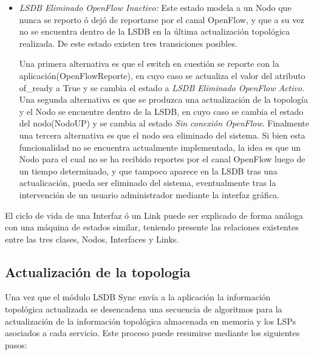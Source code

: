 \begin{itemize}
De este estado existen tres transiciones posibles. Por un lado el nodo puede estar presente en la LSDB al producirse una actualizaci\'on de la topolog\'ia(LSDBSyncActualizarTopologia), actualizandose la informaci\'on del nodo(ActualizarNodo) y manteniéndose en el mismo estado. Por otro lado tambi\'en al producirse una actualizaci\'on de la topolog\'ia, el nodo puede no estar en la LSDB, en cuyo caso se actualiza el estado del nodo(NodoDOWN) y se cambia al estado \textit{LSDB Eliminado OpenFlow Inactivo}. Finalmente el switch puede empezar a reportarse por el canal OpenFlow(OpenFlowReport) en cuyo caso se actualiza el valor del atributo of\_ready a True, y se cambia al estado \textit{Operativo}.  

\item \textit{LSDB Eliminado OpenFlow Inactivo:} Este estado modela a un Nodo que nunca se reporto \'o dej\'o de reportarse por el canal OpenFlow, y que a su vez no se encuentra dentro de la LSDB en la \'ultima actualizaci\'on topol\'ogica realizada. De este estado existen tres transiciones posibles.

Una primera alternativa es que el switch en cuesti\'on se reporte con la aplicaci\'on(OpenFlowReporte), en cuyo caso se actualiza el valor del atributo of\_ready a True y se cambia el estado a \textit{LSDB Eliminado OpenFlow Activo}. Una segunda alternativa es que se produzca una actualizaci\'on de la topolog\'ia y el Nodo se encuentre dentro de la LSDB, en cuyo caso se cambia el estado del nodo(NodoUP) y se cambia al estado \textit{Sin conexión OpenFlow}. Finalmente una tercera alternativa es que el nodo  sea eliminado del sistema. Si bien esta funcionalidad no se encuentra actualmente implementada, la idea es que un Nodo para el cual no se ha recibido reportes por el canal OpenFlow luego de un tiempo determinado, y que tampoco aparece en la LSDB tras una actualicaci\'on, pueda ser eliminado del sistema, eventualmente tras la intervenci\'on de un usuario administrador mediante la interfaz gr\'afica.
  
\end{itemize}

El ciclo de vida de una Interfaz \'o un Link puede ser explicado de forma an\'aloga con una m\'aquina de estados similar, teniendo presente las relaciones existentes entre las tres clases, Nodos, Interfaces y Links.

\newpage
\subsection{Actualizaci\'on de la topologia}
Una vez que el m\'odulo LSDB Sync envía a la aplicaci\'on la informaci\'on topol\'ogica actualizada se desencadena una secuencia de algoritmos para la actualizaci\'on de la informaci\'on topol\'ogica almacenada en memoria y los LSPs asociados a cada servicio. Este proceso puede resumirse mediante los siguientes pasos:

